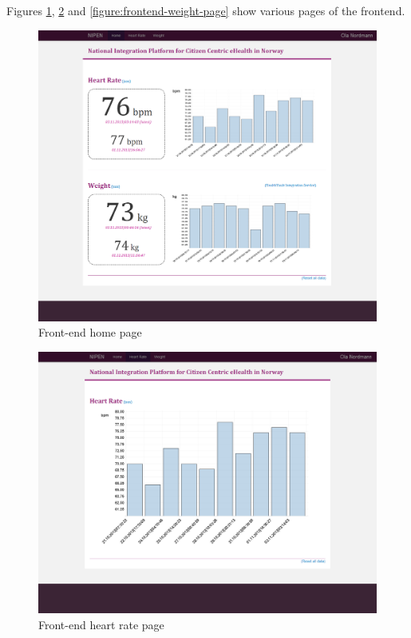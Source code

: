 Figures \ref{figure:frontend-main-page}, \ref{figure:frontend-heart-rate-page} and \ref{figure:frontend-weight-page}
show various pages of the frontend.


\begin{figure}[H]
\centering
\includegraphics[scale=0.4]{../Figures/frontend-main-page.png}
\caption{Front-end home page}
\label{figure:frontend-main-page}
\end{figure}

\begin{figure}[H]
\centering
\includegraphics[scale=0.4]{../Figures/frontend-heart-rate-page.png}
\caption{Front-end heart rate page}
\label{figure:frontend-heart-rate-page}
\end{figure}


